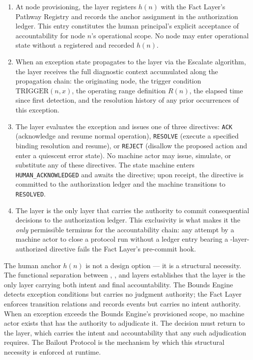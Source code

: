 \begin{enumerate}\itemsep=0pt
\item[\emph{Registration.}] At node provisioning, the \purpose{} layer registers $h(n)$ with the Fact Layer's Pathway Registry and records the anchor assignment in the authorization ledger. This entry constitutes the human principal's explicit acceptance of accountability for node $n$'s operational scope. No node may enter operational state without a registered and recorded $h(n)$.

\item[\emph{Exception reception.}] When an exception state propagates to the \purpose{} layer via the Escalate algorithm, the \purpose{} layer receives the full diagnostic context accumulated along the propagation chain: the originating node, the trigger condition $\text{TRIGGER}(n, x)$, the operating range definition $R(n)$, the elapsed time since first detection, and the resolution history of any prior occurrences of this exception.

\item[\emph{Directive issuance.}] The \purpose{} layer evaluates the exception and issues one of three directives: \texttt{ACK} (acknowledge and resume normal operation), \texttt{RESOLVE} (execute a specified binding resolution and resume), or \texttt{REJECT} (disallow the proposed action and enter a quiescent error state). No machine actor may issue, simulate, or substitute any of these directives. The state machine enters \texttt{HUMAN\_ACKNOWLEDGED} and awaits the directive; upon receipt, the directive is committed to the authorization ledger and the machine transitions to \texttt{RESOLVED}.

\item[\emph{Consequential commitment.}] The \purpose{} layer is the only layer that carries the authority to commit consequential decisions to the authorization ledger. This exclusivity is what makes it the \emph{only} permissible terminus for the accountability chain: any attempt by a machine actor to close a protocol run without a ledger entry bearing a \purpose-layer-authorized directive fails the Fact Layer's pre-commit hook.
\end{enumerate}

The human anchor $h(n)$ is not a design option --- it is a structural necessity. The functional separation between \purpose{}, \bounds{}, and \fact{} layers establishes that the \purpose{} layer is the only layer carrying both intent and final accountability. The Bounds Engine detects exception conditions but carries no judgment authority; the Fact Layer enforces transition relations and records events but carries no intent authority. When an exception exceeds the Bounds Engine's provisioned scope, no machine actor exists that has the authority to adjudicate it. The decision must return to the \purpose{} layer, which carries the intent and accountability that any such adjudication requires. The Bailout Protocol is the mechanism by which this structural necessity is enforced at runtime.

